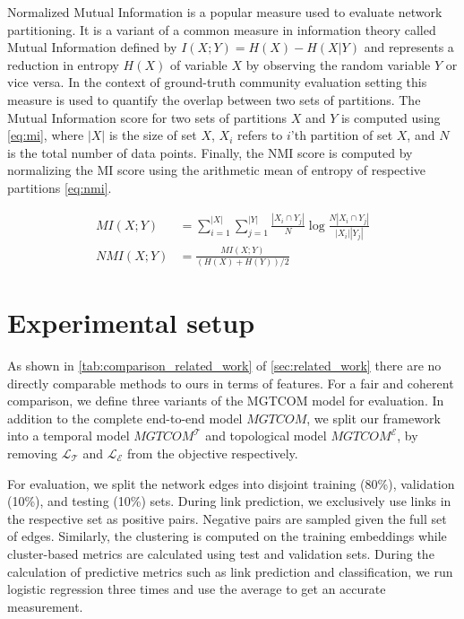 \begin{secDefinition}\label{def:nmi}
Normalized Mutual Information is a popular measure used to evaluate network partitioning. 
It is a variant of a common measure in information theory called Mutual Information defined by $I(X; Y) = H(X) - H(X| Y)$ and represents a reduction in entropy $H(X)$ of variable $X$ by observing the random variable $Y$ or vice versa.
In the context of ground-truth community evaluation setting this measure is used to quantify the overlap between two sets of partitions.
The Mutual Information score for two sets of partitions $X$ and $Y$ is computed using \cref{eq:mi}, where $|X|$ is the size of set $X$, $X_i$ refers to $i$'th partition of set $X$, and $N$ is the total number of data points.
Finally, the NMI score is computed by normalizing the MI score using the arithmetic mean of entropy of respective partitions \cref{eq:nmi}.

\begin{align}
    MI(X; Y) &= \sum_{i=1}^{|X|} \sum_{j=1}^{|Y|} \frac{\left|X_{i} \cap Y_{j}\right|}{N} \log \frac{N\left|X_{i} \cap Y_{j}\right|}{\left|X_{i}\right|\left|Y_{j}\right|} \label{eq:mi} \\
    NMI(X; Y) &= \frac{MI(X; Y)}{(H(X) + H(Y)) / 2} \label{eq:nmi}
\end{align}

\end{secDefinition}

\section{Experimental setup} \label{sec:exp_setup}
As shown in \cref{tab:comparison_related_work} of \cref{sec:related_work} there are no directly comparable methods to ours in terms of features.
For a fair and coherent comparison, we define three variants of the MGTCOM model for evaluation.
In addition to the complete end-to-end model $MGTCOM$, we split our framework into a temporal model $MGTCOM^{\mathcal{T}}$ and topological model $MGTCOM^{\mathcal{E}}$, by removing $\mathcal{L}_{\mathcal{T}}$ and $\mathcal{L}_{\mathcal{E}}$ from the objective respectively.

For evaluation, we split the network edges into disjoint training (80\%), validation (10\%), and testing (10\%) sets.  
During link prediction, we exclusively use links in the respective set as positive pairs.
Negative pairs are sampled given the full set of edges.
Similarly, the clustering is computed on the training embeddings while cluster-based metrics are calculated using test and validation sets.
During the calculation of predictive metrics such as link prediction and classification, we run logistic regression three times and use the average to get an accurate measurement.

